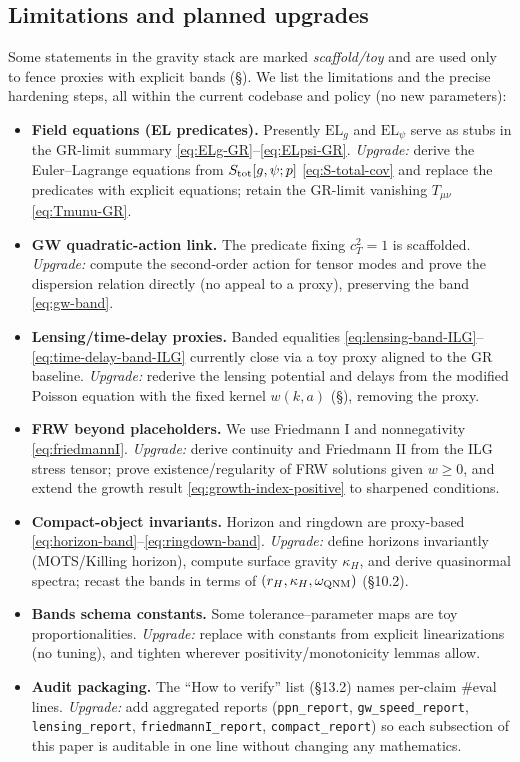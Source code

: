 \documentclass[12pt,a4paper]{article}
\begin{document}
\subsection{Limitations and planned upgrades}
Some statements in the gravity stack are marked \emph{scaffold/toy} and are used only to fence proxies with explicit bands (\S{}). We list the limitations and the precise hardening steps, all within the current codebase and policy (no new parameters):
\begin{itemize}
  \item \textbf{Field equations (EL predicates).} Presently \(\mathrm{EL}_g\) and \(\mathrm{EL}_\psi\) serve as stubs in the GR-limit summary \eqref{eq:ELg-GR}–\eqref{eq:ELpsi-GR}. \emph{Upgrade:} derive the Euler–Lagrange equations from \(S_{\rm tot}[g,\psi;p]\) \eqref{eq:S-total-cov} and replace the predicates with explicit equations; retain the GR-limit vanishing \(T_{\mu\nu}\) \eqref{eq:Tmunu-GR}.
  \item \textbf{GW quadratic-action link.} The predicate fixing \(c_T^2=1\) is scaffolded. \emph{Upgrade:} compute the second-order action for tensor modes and prove the dispersion relation directly (no appeal to a proxy), preserving the band \eqref{eq:gw-band}.
  \item \textbf{Lensing/time-delay proxies.} Banded equalities \eqref{eq:lensing-band-ILG}–\eqref{eq:time-delay-band-ILG} currently close via a toy proxy aligned to the GR baseline. \emph{Upgrade:} rederive the lensing potential and delays from the modified Poisson equation with the fixed kernel \(w(k,a)\) (\S{}), removing the proxy.
  \item \textbf{FRW beyond placeholders.} We use Friedmann I and nonnegativity \eqref{eq:friedmannI}. \emph{Upgrade:} derive continuity and Friedmann II from the ILG stress tensor; prove existence/regularity of FRW solutions given \(w\ge 0\), and extend the growth result \eqref{eq:growth-index-positive} to sharpened conditions.
  \item \textbf{Compact-object invariants.} Horizon and ringdown are proxy-based \eqref{eq:horizon-band}–\eqref{eq:ringdown-band}. \emph{Upgrade:} define horizons invariantly (MOTS/Killing horizon), compute surface gravity \(\kappa_H\), and derive quasinormal spectra; recast the bands in terms of \((r_H,\kappa_H,\omega_{\rm QNM})\) (§10.2).
  \item \textbf{Bands schema constants.} Some tolerance–parameter maps are toy proportionalities. \emph{Upgrade:} replace with constants from explicit linearizations (no tuning), and tighten wherever positivity/monotonicity lemmas allow.
  \item \textbf{Audit packaging.} The “How to verify” list (§13.2) names per-claim \#eval lines. \emph{Upgrade:} add aggregated reports (\texttt{ppn\_report}, \texttt{gw\_speed\_report}, \texttt{lensing\_report}, \texttt{friedmannI\_report}, \texttt{compact\_report}) so each subsection of this paper is auditable in one line without changing any mathematics.
\end{itemize}
\end{document}
